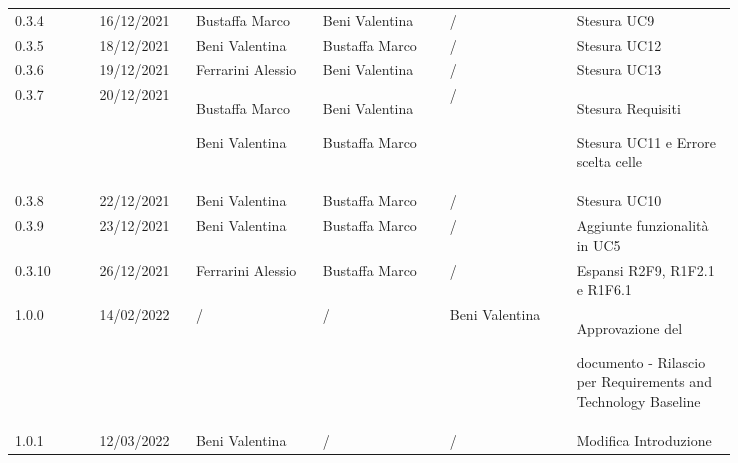 {\begin{tabular}{p{0.10\linewidth}p{0.10\linewidth}p{0.15\linewidth}p{0.15\linewidth}p{0.15\linewidth}p{0.19\linewidth}}
	\rowcolor[RGB]{233, 245, 206}
	0.3.4 & 16/12/2021 & Bustaffa Marco& Beni Valentina &/& Stesura UC9\\
	\rowcolor[RGB]{216, 235, 171}
	0.3.5 & 18/12/2021 & Beni Valentina& Bustaffa Marco &/& Stesura UC12\\
	\rowcolor[RGB]{233, 245, 206}
	0.3.6 & 19/12/2021 & Ferrarini Alessio& Beni Valentina &/& Stesura UC13\\
	\rowcolor[RGB]{216, 235, 171}
	0.3.7 & 20/12/2021 & Bustaffa Marco \par Beni Valentina & Beni Valentina \par Bustaffa Marco & /& Stesura Requisiti \par Stesura UC11 e Errore scelta celle\\
	\rowcolor[RGB]{233, 245, 206}
	0.3.8 & 22/12/2021 & Beni Valentina& Bustaffa Marco &/& Stesura UC10\\
	\rowcolor[RGB]{216, 235, 171}
	0.3.9 & 23/12/2021 & Beni Valentina& Bustaffa Marco &/& Aggiunte funzionalità in UC5\\
	\rowcolor[RGB]{233, 245, 206}
	0.3.10 & 26/12/2021 & Ferrarini Alessio & Bustaffa Marco &/& Espansi R2F9, R1F2.1 e R1F6.1\\
	\rowcolor[RGB]{216, 235, 171}
	1.0.0 & 14/02/2022 & / & / & Beni Valentina & Approvazione del \par documento - Rilascio per Requirements and Technology Baseline\\
	\rowcolor[RGB]{233, 245, 206}
	1.0.1 & 12/03/2022 & Beni Valentina & / & / & Modifica Introduzione\\

\end{tabular}
}
